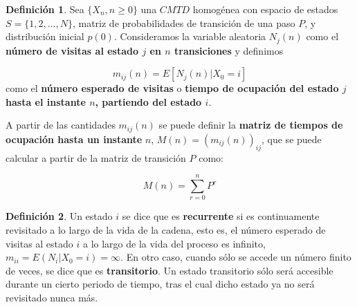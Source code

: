 \documentclass[
]{book}
\newenvironment{yellowbox}{
  \definecolor{shadecolor}{rgb}{210, 180, 140}  
  \color{black}
  \begin{shaded}}
 {\end{shaded}}
\theoremstyle{definition}
\newtheorem{definition}{Definición}[chapter]
\theoremstyle{definition}
\theoremstyle{definition}
\theoremstyle{definition}
\theoremstyle{remark}
\begin{document}
\begin{yellowbox}

\begin{definition}

Sea \(\{X_n, n \geq 0\}\) una \(CMTD\) homogénea con espacio de estados \(S = \{1, 2,...,N\}\), matriz de probabilidades de transición de una paso \(P\), y distribución inicial \(p(0)\). Consideramos la variable aleatoria \(N_j(n)\) como el \textbf{número de visitas al estado \(j\) en \(n\) transiciones} y definimos

\[m_{ij}(n) = E[N_j(n)|X_0 = i]\]
como el \textbf{número esperado de visitas} o \textbf{tiempo de ocupación del estado \(j\) hasta el instante \(n\), partiendo del estado \(i\)}.

A partir de las cantidades \(m_{ij}(n)\) se puede definir la \textbf{matriz de tiempos de ocupación hasta un instante} \(n\), \(M(n)=(m_{ij}(n))_{ij}\), que se puede calcular a partir de la matriz de transición \(P\) como:

\begin{equation}
M(n) = \sum_{r=0}^n P^r
\label{eq:tposocupa}
\end{equation}

\end{definition}

\end{yellowbox}

\begin{yellowbox}

\begin{definition}
Un estado \(i\) se dice que es \textbf{recurrente} si es continuamente revisitado a lo largo de la vida de la cadena, esto es, el número esperado de visitas al estado \(i\) a lo largo de la vida del proceso es infinito, \(m_{ii}=E(N_i|X_0=i)=\infty\). En otro caso, cuando sólo se accede un número finito de veces, se dice que es \textbf{transitorio}. Un estado transitorio sólo será accesible durante un cierto periodo de tiempo, tras el cual dicho estado ya no será revisitado nunca más.
\end{definition}

\end{yellowbox}
\end{document}
